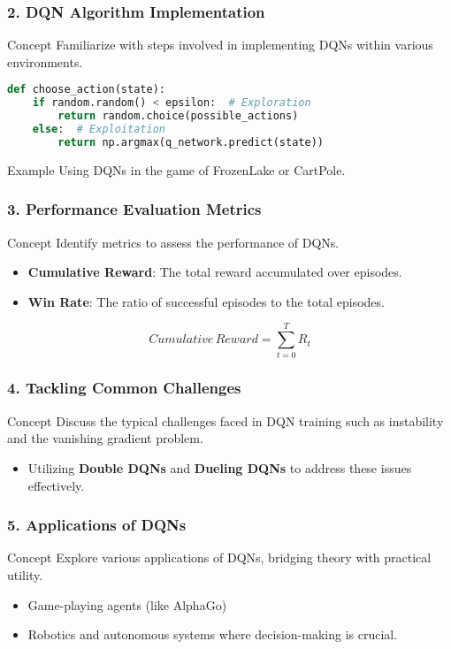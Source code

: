 \documentclass{beamer}
\begin{document}
\begin{frame}[fragile]
    \frametitle{2. DQN Algorithm Implementation}
    \begin{block}{Concept}
        Familiarize with steps involved in implementing DQNs within various environments.
    \end{block}
    \begin{lstlisting}[language=Python]
def choose_action(state):
    if random.random() < epsilon:  # Exploration
        return random.choice(possible_actions)
    else:  # Exploitation
        return np.argmax(q_network.predict(state))
    \end{lstlisting}
    \begin{block}{Example}
        Using DQNs in the game of FrozenLake or CartPole.
    \end{block}
\end{frame}

\begin{frame}[fragile]
    \frametitle{3. Performance Evaluation Metrics}
    \begin{block}{Concept}
        Identify metrics to assess the performance of DQNs.
    \end{block}
    \begin{itemize}
        \item \textbf{Cumulative Reward}: The total reward accumulated over episodes.
        \item \textbf{Win Rate}: The ratio of successful episodes to the total episodes.
    \end{itemize}
    \begin{equation}
    Cumulative\, Reward = \sum_{t=0}^{T} R_t
    \end{equation}
\end{frame}

\begin{frame}[fragile]
    \frametitle{4. Tackling Common Challenges}
    \begin{block}{Concept}
        Discuss the typical challenges faced in DQN training such as instability and the vanishing gradient problem.
    \end{block}
    \begin{itemize}
        \item Utilizing \textbf{Double DQNs} and \textbf{Dueling DQNs} to address these issues effectively.
    \end{itemize}
\end{frame}

\begin{frame}[fragile]
    \frametitle{5. Applications of DQNs}
    \begin{block}{Concept}
        Explore various applications of DQNs, bridging theory with practical utility.
    \end{block}
    \begin{itemize}
        \item Game-playing agents (like AlphaGo)
        \item Robotics and autonomous systems where decision-making is crucial.
    \end{itemize}
\end{frame}
\end{document}
